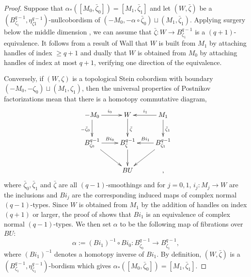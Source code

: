 \documentclass[12pt]{amsart}
\newcommand\scxs{\zeta}					%
\newcommand\bscxs{\bar \zeta}			%
\theoremstyle{remark}
\begin{document}
\begin{proof}
Suppose that $\alpha_*([M_0, \bar \zeta_0]) = [M_1, \bar \zeta_1]$ and let $(W,\bar \zeta)$ be a $(B^{q{-}1}_{\scxs_1}, \eta^{q{-}1}_{\scxs1})$-nullcobordism of 
$(-M_0, -\alpha \circ \bscxs_0) \sqcup (M_1, \bscxs_1)$. 
Applying surgery below the middle dimension \cite[Proposition 2.6]{BCS2}, 
we can assume that $\bscxs \colon W \to B^{q{-}1}_{\scxs_1}$ is 
a $(q{+}1)$-equivalence. It follows from a result of Wall \cite[Theorem 2.18]{BCS2} that $W$ is built 
from $M_1$ by attaching handles of index $\ge q{+}1$ and dually that $W$ is obtained from $M_0$ 
by attaching handles of index at most $q{+}1$, verifying one direction of the equivalence. 


Conversely, if $(W, \zeta)$ is a topological Stein cobordism with boundary
$(-M_0, -\scxs_0) \sqcup (M_1, \scxs_1)$, then 
the universal properties of Postnikov factorizations 
\cite[Chapters 2 \& 5]{Baues77} mean that there
is a homotopy commutative diagram,
%
\[ \xymatrix{ -M_0 \ar[d]_{-\bscxs_0} \ar[r]^{i_0} & W \ar[d]^{\bscxs} & 
M_1 \ar[d]^{\bscxs_1} \ar[l]_{i_1} \\
B^{q{-}1}_{\scxs_0} \ar[dr] \ar[r]^{Bi_0} & B^{q{-}1}_{\scxs} \ar[d] & 
B^{q{-}1}_{\scxs_1} \ar[dl] \ar[l]_{Bi_1} \\
& BU&
,  } \]
%
where $\bscxs_0, \bscxs_1$ and $\bscxs$ are all $(q{-}1)$-smoothings and
for $j = 0, 1$, $i_j \colon M_j \to W$ are the inclusions and $Bi_j$
are the corresponding induced maps of complex normal $(q{-}1)$-types.
Since $W$ is obtained from $M_1$ by the addition of handles on index
$(q{+}1)$ or larger, the proof of \cite[Lemma 2.9 (3)]{BCS2}
shows that $Bi_1$ is an equivalence of complex normal $(q{-}1)$-types.
We then set $\alpha$ to be the following map of fibrations over $BU$:
%
\[ \alpha  := (Bi_1)^{-1} \circ Bi_0 \colon B^{q{-}1}_{\scxs_0} \to B^{q{-}1}_{\scxs_1},\]
%
where $(Bi_1)^{-1}$ denotes a homotopy inverse of $Bi_1$. By definition, $(W, \bscxs)$ is a $(B^{q{-}1}_{\scxs_1}, \eta^{q{-}1}_{\scxs_1})$-bordism
which gives $\alpha_*([M_0, \bscxs_0]) = [M_1, \bscxs_1]$.
%
%
%
\end{proof}
\end{document}
